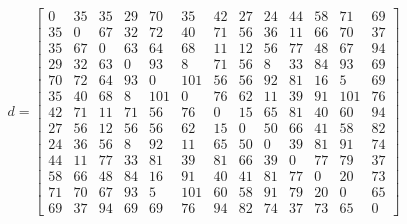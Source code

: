 \begin{equation}d=\left[\begin{array}{ccccccccccccc}0 & 35 & 35 & 29 & 70 & 35 & 42 & 27 & 24 & 44 & 58 & 71 & 69\\35 & 0 & 67 & 32 & 72 & 40 & 71 & 56 & 36 & 11 & 66 & 70 & 37\\35 & 67 & 0 & 63 & 64 & 68 & 11 & 12 & 56 & 77 & 48 & 67 & 94\\29 & 32 & 63 & 0 & 93 & 8 & 71 & 56 & 8 & 33 & 84 & 93 & 69\\70 & 72 & 64 & 93 & 0 & 101 & 56 & 56 & 92 & 81 & 16 & 5 & 69\\35 & 40 & 68 & 8 & 101 & 0 & 76 & 62 & 11 & 39 & 91 & 101 & 76\\42 & 71 & 11 & 71 & 56 & 76 & 0 & 15 & 65 & 81 & 40 & 60 & 94\\27 & 56 & 12 & 56 & 56 & 62 & 15 & 0 & 50 & 66 & 41 & 58 & 82\\24 & 36 & 56 & 8 & 92 & 11 & 65 & 50 & 0 & 39 & 81 & 91 & 74\\44 & 11 & 77 & 33 & 81 & 39 & 81 & 66 & 39 & 0 & 77 & 79 & 37\\58 & 66 & 48 & 84 & 16 & 91 & 40 & 41 & 81 & 77 & 0 & 20 & 73\\71 & 70 & 67 & 93 & 5 & 101 & 60 & 58 & 91 & 79 & 20 & 0 & 65\\69 & 37 & 94 & 69 & 69 & 76 & 94 & 82 & 74 & 37 & 73 & 65 & 0\end{array}\right]\label{eqn:tsp}\end{equation}
